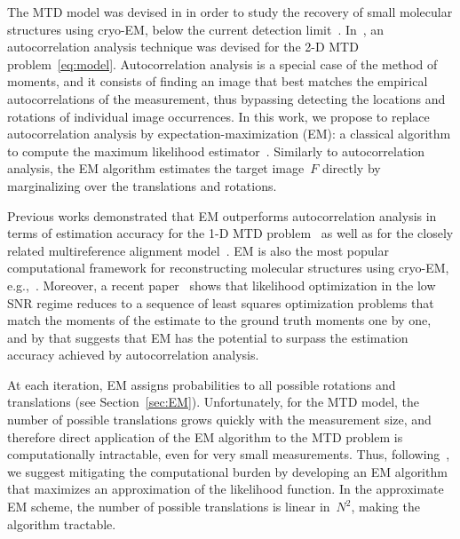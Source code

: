 \documentclass{article}
\begin{document}
The MTD model was devised in \cite{bendory2018toward} in order to study the recovery of small molecular structures using cryo-EM, below the current detection limit~\cite{d2021current}. In~\cite{marshall2020image, bendory2021multi, kreymer2021two}, an autocorrelation analysis technique was devised for the 2-D MTD problem~\eqref{eq:model}. Autocorrelation analysis is a special case of the method of moments, and it consists of finding an image that best matches the empirical autocorrelations of the measurement, thus bypassing detecting the locations and rotations of individual image occurrences. %
In this work, we propose to replace autocorrelation analysis by expectation-maximization (EM): a classical algorithm to compute the  maximum likelihood estimator~\cite{dempster1977maximum}.
Similarly to autocorrelation analysis, the EM algorithm estimates the target image~$F$ directly by marginalizing over the translations and rotations.

Previous works demonstrated that EM outperforms autocorrelation analysis in terms of estimation accuracy for the \mbox{1-D} MTD problem~\cite{lan2020multi} as well as for the closely related multireference alignment model~\cite{bendory2017bispectrum, abbe2018multireference}. EM is also the most popular computational framework for reconstructing molecular structures using cryo-EM, e.g.,~\cite{scheres2012relion, punjani2017cryosparc}. Moreover, a recent paper~\cite{katsevich2020likelihood} shows that likelihood optimization in the low SNR regime reduces to a sequence of least squares optimization problems that match the moments of the estimate to the ground truth moments one by one, and by that suggests that EM has the potential to surpass the estimation accuracy achieved by autocorrelation analysis.

At each iteration, EM assigns probabilities to all possible rotations and translations (see Section~\ref{sec:EM}). Unfortunately, for the MTD model, the number of possible translations grows quickly with the measurement size, and therefore direct application of the EM algorithm to the MTD problem is computationally intractable, even for very small measurements. Thus, following~\cite{lan2020multi}, we suggest mitigating the computational burden by developing an EM algorithm that maximizes an approximation of the likelihood function. In the approximate EM scheme, the number of possible translations is linear in~$N^2$, making the algorithm tractable.
\end{document}
